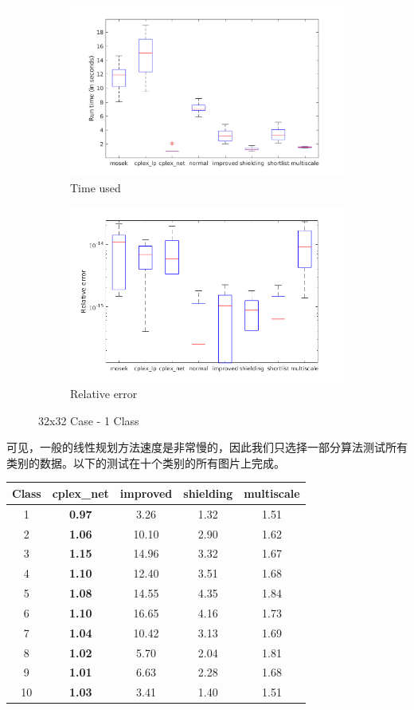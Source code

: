 \documentclass[]{article}
\begin{document}
\begin{figure}[htpb]
	\centering
	\begin{subfigure}{0.49 \textwidth}
		\centering
		\includegraphics[width = \textwidth]{../pic-tests/plot/time_32x_1x5.png}
		\caption{Time used}
	\end{subfigure}
	\begin{subfigure}{0.49 \textwidth}
		\centering
		\includegraphics[width = \textwidth]{../pic-tests/plot/error_32x_1x5.png}
		\caption{Relative error}
	\end{subfigure}
	\caption{32x32 Case - 1 Class}
\end{figure}

可见，一般的线性规划方法速度是非常慢的，因此我们只选择一部分算法测试所有类别的数据。以下的测试在十个类别的所有图片上完成。

\begin{longtable}[]{@{}c|cccc@{}}
\hline
Class & cplex\_net & improved & shielding & multiscale\tabularnewline
\hline
1 & \textbf{0.97} & 3.26 & 1.32 & 1.51\tabularnewline
2 & \textbf{1.06} & 10.10 & 2.90 & 1.62\tabularnewline
3 & \textbf{1.15} & 14.96 & 3.32 & 1.67\tabularnewline
4 & \textbf{1.10} & 12.40 & 3.51 & 1.68\tabularnewline
5 & \textbf{1.08} & 14.55 & 4.35 & 1.84\tabularnewline
6 & \textbf{1.10} & 16.65 & 4.16 & 1.73\tabularnewline
7 & \textbf{1.04} & 10.42 & 3.13 & 1.69\tabularnewline
8 & \textbf{1.02} & 5.70 & 2.04 & 1.81\tabularnewline
9 & \textbf{1.01} & 6.63 & 2.28 & 1.68\tabularnewline
10 & \textbf{1.03} & 3.41 & 1.40 & 1.51\tabularnewline
\hline
\end{longtable}
\end{document}
